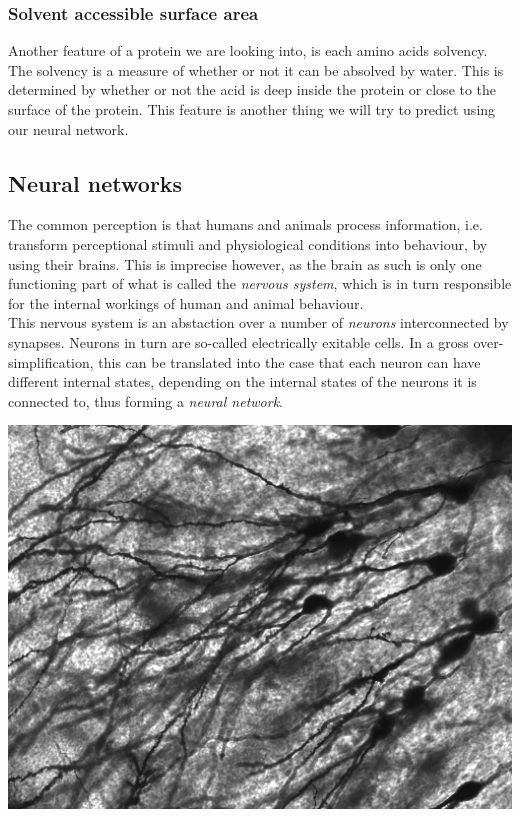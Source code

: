 \subsubsection{Solvent accessible surface area}
Another feature of a protein we are looking into, is each amino acids solvency. The solvency is a measure of whether or not it can be absolved by water. This is determined by whether or not the acid is deep inside the protein or close to the surface of the protein. This feature is another thing we will try to predict using our neural network. 

\subsection{Neural networks}
The common perception is that humans and animals process information, i.e. transform perceptional 
stimuli and physiological conditions into behaviour, by using their brains. This is imprecise 
however, as the brain as such is only one functioning part of what is called the \textit{nervous 
system}, which is in turn responsible for the internal workings of human and animal behaviour.\\
This nervous system is an abstaction over a number of \textit{neurons} interconnected by 
synapses. Neurons in turn are so-called electrically exitable cells. In a gross over-simplification, this can be translated into the case that each neuron can have different internal states, depending on the internal states of the neurons it is connected to, thus forming a \textit{neural network}.


\begin{Figure}
 \centering
 \includegraphics[width=0.8\linewidth]{images/Gyrus_Dentatus_40x}
 \captionsetup{width=0.8\linewidth, font=small}
\end{Figure}

